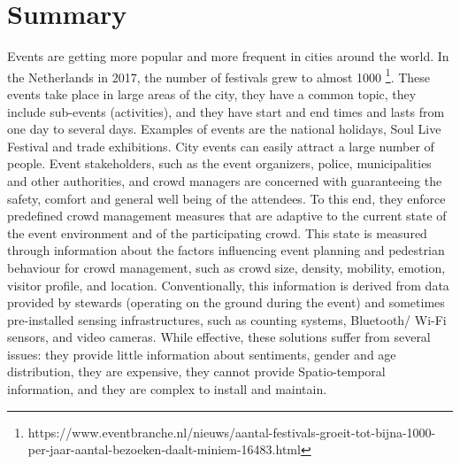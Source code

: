 \chapter*{Summary}

Events are getting more popular and more frequent in cities around the world. In the Netherlands in 2017, the number of festivals grew to almost 1000 \footnote{https://www.eventbranche.nl/nieuws/aantal-festivals-groeit-tot-bijna-1000-per-jaar-aantal-bezoeken-daalt-miniem-16483.html}. These events take place in large areas of the city, they have a common topic, they include sub-events (activities), and they have start and end times and lasts from one day to several days. Examples of events are the national holidays, Soul Live Festival and trade exhibitions. City events can easily attract a large number of people. Event stakeholders, such as the event organizers, police, municipalities and other authorities, and crowd managers are concerned with guaranteeing the safety, comfort and general well being of the attendees. To this end, they enforce predefined crowd management measures that are adaptive to the current state of the event environment and of the participating crowd. This state is measured through information about the factors influencing event planning \citep{li2019crowds} and pedestrian behaviour \citep{still2000crowd,tubbs2007egress,abbott2000event, zomer2015managing} for crowd management, such as crowd size, density, mobility, emotion, visitor profile, and location. Conventionally, this information is derived from data provided by stewards (operating on the ground during the event) and sometimes pre-installed sensing infrastructures, such as counting systems, Bluetooth/ Wi-Fi sensors, and video cameras. While effective, these solutions suffer from several issues: they provide little information about sentiments, gender and age distribution, they are expensive, they cannot provide Spatio-temporal information, and they are complex to install and maintain.  

